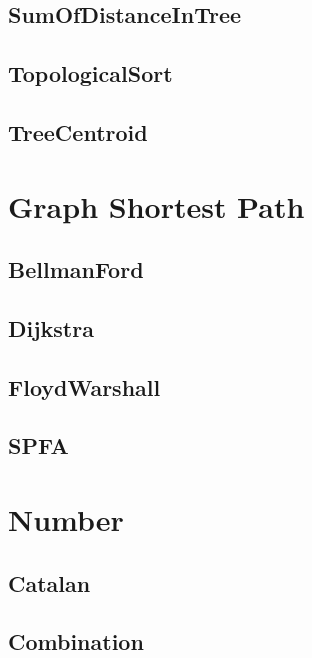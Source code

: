 \subsection{SumOfDistanceInTree}

\subsection{TopologicalSort}

\subsection{TreeCentroid}


\section{Graph Shortest Path}

\subsection{BellmanFord}

\subsection{Dijkstra}

\subsection{FloydWarshall}

\subsection{SPFA}


\section{Number}

\subsection{Catalan}

\subsection{Combination}

